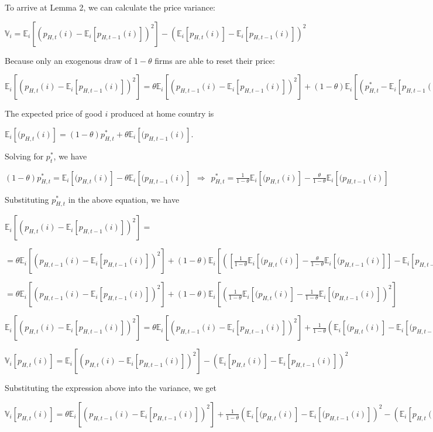 \documentclass[
]{article}
\begin{document}
To arrive at Lemma 2, we can calculate the price variance:

\(\mathbb{V}_i=\mathbb{E}_i[(p_{H,t}(i)-\mathbb{E}_i[p_{H,t-1}(i)])^2]-(\mathbb{E}_i[p_{H,t}(i)]-\mathbb{E}_i[p_{H,t-1}(i)])^2\)

Because only an exogenous draw of \(1-\theta\) firms are able to reset
their price:

\(\mathbb{E}_i[(p_{H,t}(i)-\mathbb{E}_i[p_{H,t-1}(i)])^2]=\theta\mathbb{E}_i[(p_{H,t-1}(i)-\mathbb{E}_i[p_{H,t-1}(i)])^2] + (1-\theta)\mathbb{E}_i[(p_{H,t}^*-\mathbb{E}_i[p_{H,t-1}(i)])^2]\)

The expected price of good \(i\) produced at home country is

\(\mathbb{E}_i[(p_{H,t}(i)]=(1-\theta)p_{H,t}^*+ \theta \mathbb{E}_i[(p_{H,t-1}(i)]\).

Solving for \(p_t^*\), we have

\(\displaystyle (1-\theta)p_{H,t}^* = \mathbb{E}_i[(p_{H,t}(i)]- \theta \mathbb{E}_i[(p_{H,t-1}(i)] \ \ \Rightarrow \ \ p_{H,t}^* = \frac{1}{1-\theta}\mathbb{E}_i[(p_{H,t}(i)]- \frac{\theta}{1-\theta} \mathbb{E}_i[(p_{H,t-1}(i)]\)

Substituting \(p_{H,t}^*\) in the above equation, we have

\(\displaystyle \mathbb{E}_i[(p_{H,t}(i)-\mathbb{E}_i[p_{H,t-1}(i)])^2]=\)

\(\displaystyle =\theta \mathbb{E}_i[(p_{H,t-1}(i)-\mathbb{E}_i[p_{H,t-1}(i)])^2] + (1-\theta)\mathbb{E}_i\left[ \left( \left[ \frac{1}{1-\theta}\mathbb{E}_i[(p_{H,t}(i)]- \frac{\theta}{1-\theta} \mathbb{E}_i[(p_{H,t-1}(i)] \right]-\mathbb{E}_i[p_{H,t-1}(i)]\right)^2 \right]\)

\(\displaystyle = \theta \mathbb{E}_i[(p_{H,t-1}(i)-\mathbb{E}_i[p_{H,t-1}(i)])^2] + (1-\theta)\mathbb{E}_i\left[ \left( \frac{1}{1-\theta}\mathbb{E}_i[(p_{H,t}(i)]- \frac{1}{1-\theta} \mathbb{E}_i[(p_{H,t-1}(i)]\right)^2 \right]\)

\(\displaystyle \mathbb{E}_i[(p_{H,t}(i)-\mathbb{E}_i[p_{H,t-1}(i)])^2] = \theta \mathbb{E}_i[(p_{H,t-1}(i)-\mathbb{E}_i[p_{H,t-1}(i)])^2] + \frac{1}{1-\theta}\left( \mathbb{E}_i[(p_{H,t}(i)]- \mathbb{E}_i[(p_{H,t-1}(i)]\right)^2\)

\(\displaystyle \mathbb{V}_i[p_{H,t}(i)] = \mathbb{E}_i[(p_{H,t}(i)-\mathbb{E}_i[p_{H,t-1}(i)])^2]-(\mathbb{E}_i[p_{H,t}(i)]-\mathbb{E}_i[p_{H,t-1}(i)])^2\)

Substituting the expression above into the variance, we get

\(\displaystyle \mathbb{V}_i[p_{H,t}(i)] = \theta \mathbb{E}_i[(p_{H,t-1}(i)-\mathbb{E}_i[p_{H,t-1}(i)])^2] + \frac{1}{1-\theta}\left( \mathbb{E}_i[(p_{H,t}(i)]- \mathbb{E}_i[(p_{H,t-1}(i)]\right)^2 - (\mathbb{E}_i[p_{H,t}(i)]-\mathbb{E}_i[p_{H,t-1}(i)])^2\)
\end{document}
